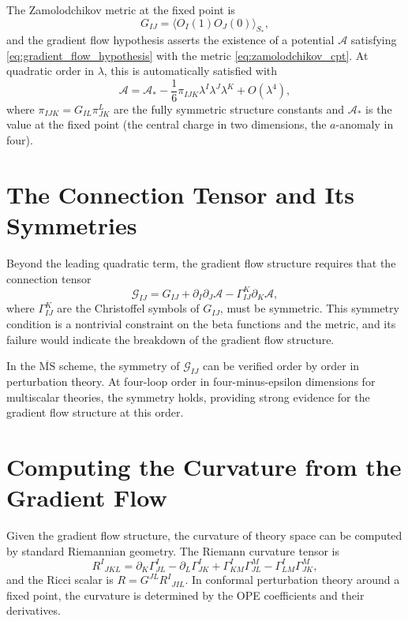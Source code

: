 \documentclass[11pt, twoside, openright]{book}
\theoremstyle{dotted}
\theoremstyle{definition}
\begin{document}
The Zamolodchikov metric at the fixed point is
\begin{equation}
  G_{IJ} = \langle O_I(1) O_J(0)\rangle_{S_*},
  \label{eq:zamolodchikov_cpt}
\end{equation}
and the gradient flow hypothesis asserts the existence of a potential $\mathcal{A}$
satisfying \eqref{eq:gradient_flow_hypothesis} with the metric \eqref{eq:zamolodchikov_cpt}.
At quadratic order in $\lambda$, this is automatically satisfied with
\begin{equation}
  \mathcal{A} = \mathcal{A}_* - \frac{1}{6}\pi_{IJK}\lambda^I\lambda^J\lambda^K + O(\lambda^4),
  \label{eq:A_potential}
\end{equation}
where $\pi_{IJK} = G_{IL}\pi_{JK}^L$ are the fully symmetric structure constants
and $\mathcal{A}_*$ is the value at the fixed point (the central charge in two
dimensions, the $a$-anomaly in four).

\section{The Connection Tensor and Its Symmetries}

Beyond the leading quadratic term, the gradient flow structure requires that the
connection tensor
\begin{equation}
  \mathcal{G}_{IJ} = G_{IJ} + \partial_I\partial_J\mathcal{A} - \Gamma_{IJ}^K\partial_K\mathcal{A},
  \label{eq:connection_tensor}
\end{equation}
where $\Gamma_{IJ}^K$ are the Christoffel symbols of $G_{IJ}$, must be symmetric.
This symmetry condition is a nontrivial constraint on the beta functions and the
metric, and its failure would indicate the breakdown of the gradient flow structure.

In the $\overline{\mathrm{MS}}$ scheme, the symmetry of $\mathcal{G}_{IJ}$ can be
verified order by order in perturbation theory. At four-loop order in four-minus-epsilon
dimensions for multiscalar theories, the symmetry holds, providing strong evidence
for the gradient flow structure at this order.

\section{Computing the Curvature from the Gradient Flow}

Given the gradient flow structure, the curvature of theory space can be computed
by standard Riemannian geometry. The Riemann curvature tensor is
\begin{equation}
  R^I{}_{JKL} = \partial_K\Gamma^I_{JL} - \partial_L\Gamma^I_{JK}
  + \Gamma^I_{KM}\Gamma^M_{JL} - \Gamma^I_{LM}\Gamma^M_{JK},
  \label{eq:riemann_tensor}
\end{equation}
and the Ricci scalar is $R = G^{JL}R^I{}_{JIL}$. In conformal perturbation theory
around a fixed point, the curvature is determined by the OPE coefficients and their
derivatives.
\end{document}
